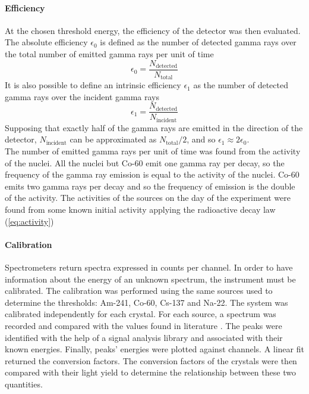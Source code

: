 \documentclass[a4paper, 11pt, table]{article}
\begin{document}
\paragraph{Efficiency}
At the chosen threshold energy, the efficiency of the detector was then evaluated. The absolute efficiency $\epsilon_0$ is defined as the number of detected gamma rays over the total number of emitted gamma rays per unit of time
\begin{equation} \label{eq:efficiency}
    \epsilon_0 = \frac{N_\text{detected}}{N_\text{total}}
\end{equation}
It is also possible to define an intrinsic efficiency $\epsilon_1$ as the number of detected gamma rays over the incident gamma rays
\begin{equation} \label{eq:intrinsic_efficiency}
    \epsilon_1 = \frac{N_\text{detected}}{N_\text{incident}}
\end{equation}
Supposing that exactly half of the gamma rays are emitted in the direction of the detector, $N_\text{incident}$ can be approximated as $N_\text{total} / 2$, and so $\epsilon_1 \approx 2\epsilon_0$.\\

The number of emitted gamma rays per unit of time was found from the activity of the nuclei. All the nuclei but Co-60 emit one gamma ray per decay, so the frequency of the gamma ray emission is equal to the activity of the nuclei. Co-60 emits two gamma rays per decay and so the frequency of emission is the double of the activity. The activities of the sources on the day of the experiment were found from some known initial activity applying the radioactive decay law (\cref{eq:activity})

\paragraph{Calibration}
Spectrometers return spectra expressed in counts per channel. In order to have information about the energy of an unknown spectrum, the instrument must be calibrated. The calibration was performed using the same sources used to determine the thresholds: Am-241, Co-60, Cs-137 and Na-22. The system was calibrated independently for each crystal. For each source, a spectrum was recorded and compared with the values found in literature \cite{heath_scintillation_1964}. The peaks were identified with the help of a signal analysis library \cite{2020SciPy-NMeth} and associated with their known energies. Finally, peaks' energies were plotted against channels. A linear fit returned the conversion factors. The conversion factors of the crystals were then compared with their light yield to determine the relationship between these two quantities.
\end{document}
